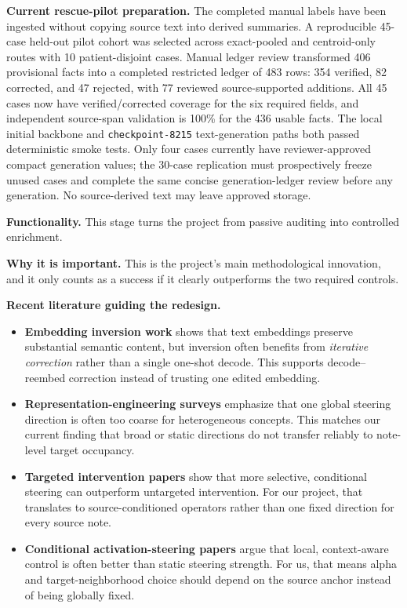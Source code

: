 \documentclass[11pt]{article}
\begin{document}
\textbf{Current rescue-pilot preparation.}
The completed manual labels have been ingested without copying source text into derived summaries. A reproducible 45-case held-out pilot cohort was selected across exact-pooled and centroid-only routes with 10 patient-disjoint cases. Manual ledger review transformed 406 provisional facts into a completed restricted ledger of 483 rows: 354 verified, 82 corrected, and 47 rejected, with 77 reviewed source-supported additions. All 45 cases now have verified/corrected coverage for the six required fields, and independent source-span validation is 100\% for the 436 usable facts. The local initial backbone and \texttt{checkpoint-8215} text-generation paths both passed deterministic smoke tests. Only four cases currently have reviewer-approved compact generation values; the 30-case replication must prospectively freeze unused cases and complete the same concise generation-ledger review before any generation. No source-derived text may leave approved storage.

\textbf{Functionality.}
This stage turns the project from passive auditing into controlled enrichment.

\textbf{Why it is important.}
This is the project's main methodological innovation, and it only counts as a success if it clearly outperforms the two required controls.

\textbf{Recent literature guiding the redesign.}
\begin{itemize}[nosep]
  \item \textbf{Embedding inversion work} shows that text embeddings preserve substantial semantic content, but inversion often benefits from \emph{iterative correction} rather than a single one-shot decode. This supports decode--reembed correction instead of trusting one edited embedding.
  \item \textbf{Representation-engineering surveys} emphasize that one global steering direction is often too coarse for heterogeneous concepts. This matches our current finding that broad or static directions do not transfer reliably to note-level target occupancy.
  \item \textbf{Targeted intervention papers} show that more selective, conditional steering can outperform untargeted intervention. For our project, that translates to source-conditioned operators rather than one fixed direction for every source note.
  \item \textbf{Conditional activation-steering papers} argue that local, context-aware control is often better than static steering strength. For us, that means alpha and target-neighborhood choice should depend on the source anchor instead of being globally fixed.
\end{itemize}
\end{document}
